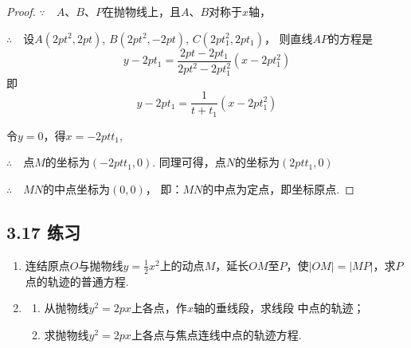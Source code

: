 \begin{proof}
$\because\quad A$、$B$、$P$在抛物线上，且$A$、$B$对称于$x$轴，


\noindent
\begin{minipage}{.52\textwidth}\CTEXindent
$\therefore\quad $设$A(2pt^2,2pt)$, $B(2pt^2,-2pt)$, $C(2pt_1^2,2pt_1)$，
则直线$AP$的方程是
\[y-2pt_1=\frac{2pt-2pt_1}{2pt^2-2pt^2_1}(x-2pt^2_1)\]
即
\[y-2pt_1=\frac{1}{t+t_1}(x-2pt^2_1)\]

令$y=0$，得$x=-2ptt_1$, 
\end{minipage}
\hfill
\begin{minipage}{.45\textwidth}
\centering
{}
\end{minipage}

$\therefore\quad $点$M$的坐标为$(-2ptt_1,0)$. 同理可得，点$N$的坐标为$(2ptt_1,0)$

$\therefore\quad MN$的中点坐标为$(0,0)$，
即：$MN$的中点为定点，即坐标原点.
\end{proof}

\subsection*{3.17 练习}
\begin{enumerate}
\item 连结原点$O$与抛物线$y=\frac{1}{2}x^2$上的动点$M$，延长$OM$至$P$，使$|OM|= |MP|$，求$P$点的轨迹的普通方程.
\item \begin{enumerate}[(1)]
    \item 从抛物线$y^2=2px$上各点，作$x$轴的垂线段，求线段
    中点的轨迹；
    \item 求抛物线$y^2=2px$上各点与焦点连线中点的轨迹方程.
\end{enumerate}
\end{enumerate}


